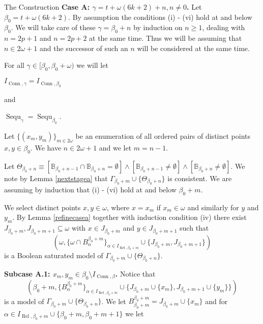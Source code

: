\documentclass{amsart}
\theoremstyle{definition}\newtheorem{theorem}{Theorem}
\theoremstyle{definition}\newtheorem{bigtheorem}{Theorem}
\numberwithin{theorem}{section}
\theoremstyle{definition}\newtheorem{corollary}[theorem]{Corollary}
\theoremstyle{definition}\newtheorem{proposition}[theorem]{Proposition}
\theoremstyle{definition}\newtheorem{definition}[theorem]{Definition}
\theoremstyle{definition}\newtheorem{question}[theorem]{Question}
\theoremstyle{definition}\newtheorem{example}[theorem]{Example}
\theoremstyle{definition}\newtheorem{remark}[theorem]{Remark}
\theoremstyle{definition}\newtheorem{note}[theorem]{Note}
\theoremstyle{definition}\newtheorem{lemma}[theorem]{Lemma}
\theoremstyle{definition}\newtheorem{fact}[theorem]{Fact}
\theoremstyle{definition}\newtheorem{define}[theorem]{Definition}
\theoremstyle{definition}\newtheorem{definitions}[theorem]{Definitions}
\theoremstyle{definition}\newtheorem{claim}[theorem]{Claim}
\theoremstyle{definition}\newtheorem{obs}[theorem]{Observation}
\theoremstyle{definition}\newtheorem{construction}[theorem]{Construction}
\newcommand{\B}{\mathbb{B}}
\newcommand{\Rel}{\operatorname{Rel}}
\newcommand{\Conn}{\operatorname{Conn}}
\newcommand{\Sequ}{\operatorname{Sequ}}
\begin{document}
\begin{section}{The Construction}
\noindent \textbf{Case A: $\gamma = t + \omega(6k + 2) + n, n \neq 0$.}  Let $\beta_0 = t + \omega(6k + 2)$.  By assumption the conditions (i) - (vi) hold at and below $\beta_0$.  We will take care of these $\gamma = \beta_0 + n$ by induction on $n \geq 1$, dealing with $n = 2p + 1$ and $n = 2p + 2$ at the same time.  Thus we will be assuming that $n\in 2\omega + 1$ and the successor of such an $n$ will be considered at the same time.

For all $\gamma \in [\beta_0, \beta_0 + \omega)$ we will let

\begin{center}

$I_{\Conn, \gamma} = I_{\Conn, \beta_0}$

\end{center}

\noindent and

\begin{center}

$\Sequ_{\gamma} = \Sequ_{\beta_0}$.

\end{center}

Let $\{(x_m, y_m)\}_{m \in 2\omega}$ be an enumeration of all ordered pairs of distinct points $x, y \in \beta_0$.  We have $n \in 2\omega +1$ and we let $m = n - 1$.


Let $\Theta_{\beta_0 + n}  \equiv [\B_{\beta_0 + n - 1} \cap \B_{\beta_0 + n} = \emptyset] \wedge [\B_{\beta_0 + n - 1} \neq \emptyset]\wedge[\B_{\beta_0 + n} \neq \emptyset]$.  We note by Lemma \ref{nextstagea} that $\Gamma_{\beta_0 + m} \cup \{\Theta_{\beta_0 + n}\}$ is consistent.  We are assuming by induction that (i) - (vi) hold at and below $\beta_0 + m$.

We select distinct points $x, y \in \omega$, where $x = x_m$ if $x_m \in \omega$ and similarly for $y$ and $y_m$.  By Lemma \ref{refinecasea} together with induction condition (iv) there exist $J_{\beta_0 + m}, J_{\beta_0 + m + 1} \subseteq \omega$ with $x \in J_{\beta_0 + m}$ and $y \in J_{\beta_0 + m + 1}$ such that $$(\omega, \{\omega \cap B_{\alpha}^{\beta_0 + m}\}_{\alpha \in I_{\Rel, \beta_0 + m}} \cup \{J_{\beta_0 + m}, J_{\beta_0 + m + 1}\})$$ is a Boolean saturated model of $\Gamma_{\beta_0 + m} \cup \{\Theta_{\beta_0 + n}\}$.


\noindent \textbf{Subcase A.1: $x_m, y_m \in \beta_0 \setminus I_{\Conn, \beta}$.}  Notice that $$(\beta_0 + m, \{B_{\alpha}^{\beta_0 + m}\}_{\alpha \in I_{\Rel, \beta_0 + m}} \cup \{J_{\beta_0 + m} \cup \{x_m\}, J_{\beta_0 + m + 1} \cup\{y_m\}\})$$  is a model of $\Gamma_{\beta_0 + m} \cup \{\Theta_{\beta_0 + n}\}$.  We let $B_{\beta_0 + m}^{\beta_0 + m} = J_{\beta_0 + m} \cup \{x_m\}$ and for $\alpha \in I_{\Rel, \beta_0 + m} \cup \{\beta_0 + m, \beta_0 + m + 1\}$ we let


\end{section}
\end{document}
